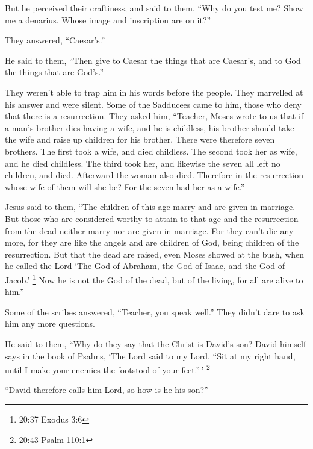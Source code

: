  But he perceived their craftiness, and said to them, ``Why
do you test me?  Show me a denarius. Whose image and
inscription are on it?''

They answered, ``Caesar's.''

 He said to them, ``Then give to Caesar the things that are
Caesar's, and to God the things that are God's.''

 They weren't able to trap him in his words before the
people. They marvelled at his answer and were silent.  Some
of the Sadducees came to him, those who deny that there is a
resurrection.  They asked him, ``Teacher, Moses wrote to us
that if a man's brother dies having a wife, and he is childless, his
brother should take the wife and raise up children for his brother.
 There were therefore seven brothers. The first took a
wife, and died childless.  The second took her as wife, and
he died childless.  The third took her, and likewise the
seven all left no children, and died.  Afterward the woman
also died.  Therefore in the resurrection whose wife of
them will she be? For the seven had her as a wife.''

 Jesus said to them, ``The children of this age marry and
are given in marriage.  But those who are considered worthy
to attain to that age and the resurrection from the dead neither marry
nor are given in marriage.  For they can't die any more,
for they are like the angels and are children of God, being children of
the resurrection.  But that the dead are raised, even Moses
showed at the bush, when he called the Lord `The God of Abraham, the God
of Isaac, and the God of Jacob.' \footnote{20:37 Exodus 3:6}
 Now he is not the God of the dead, but of the living, for
all are alive to him.''

 Some of the scribes answered, ``Teacher, you speak well.''
 They didn't dare to ask him any more questions.

 He said to them, ``Why do they say that the Christ is
David's son?  David himself says in the book of Psalms,
`The Lord said to my Lord, ``Sit at my right hand,  until I
make your enemies the footstool of your feet.''\,' \footnote{20:43 Psalm
  110:1}

 ``David therefore calls him Lord, so how is he his son?''

